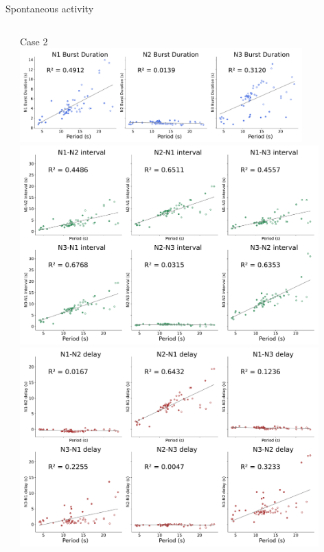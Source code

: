 \documentclass[aspectratio=43]{beamer}
\begin{document}
\begin{frame}{Spontaneous activity}
{\begin{columns}
\begin{column}{0.5\textwidth}
			\end{column}
			\begin{column}{0.5\textwidth}
				\centering \small{Case 2\\}	\includegraphics[width=0.85\textwidth]{invariants/data/SUSSEX/prep3/images/3phases/_durations_big.pdf}	\includegraphics[width=0.9\textwidth]{invariants/data/SUSSEX/prep3/images/3phases/_intervals_big.pdf}	\includegraphics[width=0.9\textwidth]{invariants/data/SUSSEX/prep3/images/3phases/_delays_big.pdf}
			\end{column}
		\end{columns}
	}
\end{frame}
\end{document}
